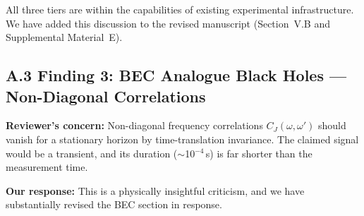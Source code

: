 \documentclass[11pt,a4paper]{article}
\begin{document}
All three tiers are within the capabilities of existing experimental infrastructure. We have added this discussion to the revised manuscript (Section~V.B and Supplemental Material~E).

\subsection*{A.3 Finding 3: BEC Analogue Black Holes --- Non-Diagonal Correlations}

\textbf{Reviewer's concern:} Non-diagonal frequency correlations $C_J(\omega, \omega')$ should vanish for a stationary horizon by time-translation invariance. The claimed signal would be a transient, and its duration ($\sim$10$^{-4}$\,s) is far shorter than the measurement time.

\textbf{Our response:} This is a physically insightful criticism, and we have substantially revised the BEC section in response.
\end{document}
